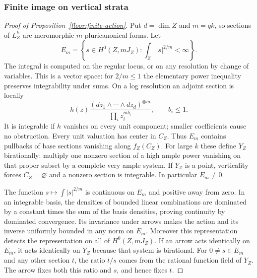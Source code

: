\subsubsection{Finite image on vertical strata}

\begin{proof}[Proof of Proposition~\ref{floor:finite-action}]
Put \(d=\dim Z\) and \(m=qk\), so sections of \(L_Z^k\) are meromorphic
\(m\)-pluricanonical forms.  Let
\[
 E_m=\left\{s\in H^0(Z,mJ_Z):\int_Z|s|^{2/m}<\infty\right\}.
\]
The integral is computed on the regular locus, or on any resolution by
change of variables.  This is a vector space: for \(2/m\leq1\) the
elementary power inequality preserves integrability under sums.  On a log
resolution an adjoint section is locally
\[
 h(z)\frac{(dz_1\wedge\cdots\wedge dz_d)^{\otimes m}}
                 {\prod_i z_i^{mb_i}},\qquad b_i\leq1.
\]
It is integrable if \(h\) vanishes on every unit component; smaller
coefficients cause no obstruction.  Every unit valuation has center in
\(C_Z\).  Thus \(E_m\) contains pullbacks of base sections vanishing
along \(f_Z(C_Z)\).  For large \(k\) these define \(Y_Z\) birationally:
multiply one nonzero section of a high ample power vanishing on that proper
subset by a complete very ample system.  If \(Y_Z\) is a point,
verticality forces \(C_Z=\varnothing\) and a nonzero section is
integrable.  In particular \(E_m\ne0\).

The function \(s\mapsto\int|s|^{2/m}\) is continuous on \(E_m\) and
positive away from zero.  In an integrable basis, the densities of bounded
linear combinations are dominated by a constant times the sum of the basis
densities, proving continuity by dominated convergence.  Its invariance
under arrows makes the action and its inverse uniformly bounded in any
norm on \(E_m\).  Moreover this representation detects the representation
on all of \(H^0(Z,mJ_Z)\).  If an arrow acts identically on \(E_m\), it
acts identically on \(Y_Z\) because that system is birational.  For
\(0\ne s\in E_m\) and any other section \(t\), the ratio \(t/s\) comes
from the rational function field of \(Y_Z\).  The arrow fixes both this
ratio and \(s\), and hence fixes \(t\).


\end{proof}
